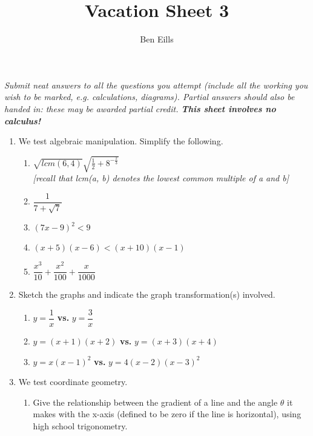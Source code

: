\documentclass{article}
\begin{document}
\title{Vacation Sheet 3}
\author{Ben Eills}
\maketitle

\textit{Submit neat answers to all the questions you attempt (include all the working you wish to be marked, e.g. calculations, diagrams).  Partial answers should also be handed in: these may be awarded partial credit.  \textbf{This sheet involves no calculus!}}

\begin{enumerate}
	\item We test algebraic manipulation.  Simplify the following.
		\begin{enumerate}
			\item $\sqrt{lcm(6, 4)}\sqrt{\frac{1}{2} + 8^{-\frac{2}{3}}} $ \\
			\textit{[recall that lcm(a, b) denotes the lowest common multiple of a and b]} 
			
			\item $\dfrac{1}{7 + \sqrt{7}}$
			
			\item $(7x - 9)^2 < 9$
			
			\item $(x+5)(x-6) < (x+10)(x-1)$
			
			\item $\dfrac{x^3}{10} + \dfrac{x^2}{100} + \dfrac{x}{1000}$
		\end{enumerate}
	
	\item Sketch the graphs and indicate the graph transformation(s) involved.
		\begin{enumerate}
			\item $y = \dfrac{1}{x}$ \textbf{vs.} $y = \dfrac{3}{x}$

			\item $y = (x+1)(x+2)$ \textbf{vs.} $y = (x+3)(x+4)$
			
			\item $y = x(x-1)^2$ \textbf{vs.} $y = 4(x-2)(x-3)^2$
		\end{enumerate}


	\item We test coordinate geometry.
		\begin{enumerate}
			\item Give the relationship between the gradient of a line and the angle $\theta$ it makes with the x-axis (defined to be zero if the line is horizontal), using high school trigonometry.
			

\end{enumerate}
\end{enumerate}
\end{document}
